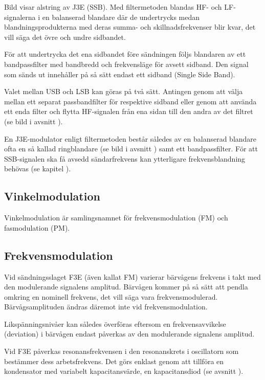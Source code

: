 Bild  visar alstring av J3E (SSB).
Med filtermetoden blandas HF- och LF-signalerna i en balanserad blandare där de
undertrycks medan blandningsprodukterna med deras summa- och
skillnadsfrekvenser blir kvar, det vill säga det övre och undre sidbandet.

För att undertrycka det ena sidbandet före sändningen följs blandaren
av ett bandpassfilter med bandbredd och frekvensläge för avsett sidband.
Den signal som sänds ut innehåller på så sätt endast ett sidband (Single Side
Band).

Valet mellan USB och LSB kan göras på två sätt.
Antingen genom att välja mellan ett separat passbandfilter för respektive
sidband eller genom att använda ett enda filter och flytta HF-signalen från ena
sidan till den andra av det filtret (se bild  i
avsnitt ).

En J3E-modulator enligt filtermetoden består således av en balanserad blandare
ofta en så kallad ringblandare (se bild  i avsnitt
) samt ett bandpassfilter.
För att SSB-signalen ska få avsedd sändarfrekvens kan ytterligare
frekvensblandning behövas (se kapitel ).

\subsection{Vinkelmodulation}

Vinkelmodulation är samlingsnamnet för frekvensmodulation (FM) och
fasmodulation (PM).

\subsection{Frekvensmodulation}

Vid sändningsslaget F3E (även kallat FM) varierar bärvågens frekvens i
takt med den modulerande signalens amplitud.
Bärvågen kommer på så sätt att pendla omkring en nominell frekvens, det vill
säga vara frekvensmodulerad.
Bärvågsamplituden ändras däremot inte vid frekvensmodulation.

Likspänningsnivåer kan således överföras eftersom en frekvensavvikelse
(deviation) i bärvågen endast påverkas av den modulerande signalens amplitud.

Vid F3E påverkas resonansfrekvensen i den resonanskrets i oscillatorn som
bestämmer dess arbetsfrekvens.
Det görs enklast genom att tillföra en kondensator med variabelt
kapacitansvärde, en kapacitansdiod (se avsnitt ).

